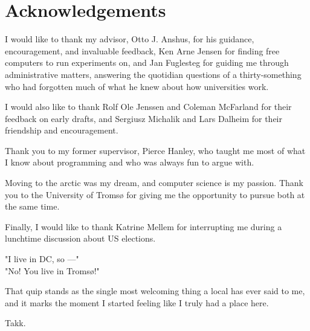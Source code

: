 \chapter{Acknowledgements}

I would like to thank my advisor, Otto J. Anshus, for his guidance,
encouragement, and invaluable feedback, Ken Arne Jensen for finding free
computers to run experiments on, and Jan Fuglesteg for guiding me through
administrative matters, answering the quotidian questions of a thirty-something
who had forgotten much of what he knew about how universities work.

I would also like to thank Rolf Ole Jenssen and Coleman McFarland for their
feedback on early drafts, and Sergiusz Michalik and Lars Dalheim for their
friendship and encouragement.

Thank you to my former supervisor, Pierce Hanley, who taught me most of what I
know about programming and who was always fun to argue with.

Moving to the arctic was my dream, and computer science is my passion.
Thank you to the University of Tromsø for giving me the opportunity to pursue
both at the same time.

Finally, I would like to thank Katrine Mellem for interrupting me during a
lunchtime discussion about US elections.

"I live in DC, so ---"\\
"No! You live in Tromsø!"

That quip stands as the single most welcoming thing a local has ever said to me,
and it marks the moment I started feeling like I truly had a place here.

Takk.
